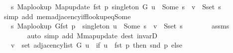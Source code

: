 \begin{isabellebody}
\ {\isachardoublequoteopen}{\isachardot}{\kern0pt}{\isachardot}{\kern0pt}{\isachardot}{\kern0pt}\ {\isasymlongleftrightarrow}\ {\isacharparenleft}{\kern0pt}{\isasymexists}s{\isachardot}{\kern0pt}\ Map{\isacharunderscore}{\kern0pt}lookup\ {\isacharparenleft}{\kern0pt}Map{\isacharunderscore}{\kern0pt}update\ {\isacharparenleft}{\kern0pt}fst\ p{\isacharparenright}{\kern0pt}\ {\isacharquery}{\kern0pt}singleton\ G{\isacharparenright}{\kern0pt}\ u\ {\isacharequal}{\kern0pt}\ Some\ s\ {\isasymand}\ v\ {\isasymin}\ S{\isachardot}{\kern0pt}set\ s{\isacharparenright}{\kern0pt}{\isachardoublequoteclose}\isanewline
\ \ \ \ \ \ \isamarkupfalse%
\ {\isacharparenleft}{\kern0pt}simp\ add{\isacharcolon}{\kern0pt}\ mem{\isacharunderscore}{\kern0pt}adjacency{\isacharunderscore}{\kern0pt}iff{\isacharunderscore}{\kern0pt}lookup{\isacharunderscore}{\kern0pt}eq{\isacharunderscore}{\kern0pt}Some{\isacharparenright}{\kern0pt}\isanewline
\ \ \ \ \isamarkupfalse%
\ \isamarkupfalse%
\ {\isachardoublequoteopen}{\isachardot}{\kern0pt}{\isachardot}{\kern0pt}{\isachardot}{\kern0pt}\ {\isasymlongleftrightarrow}\ {\isacharparenleft}{\kern0pt}{\isasymexists}s{\isachardot}{\kern0pt}\ {\isacharparenleft}{\kern0pt}Map{\isacharunderscore}{\kern0pt}lookup\ G{\isacharparenleft}{\kern0pt}fst\ p\ {\isasymmapsto}\ {\isacharquery}{\kern0pt}singleton{\isacharparenright}{\kern0pt}{\isacharparenright}{\kern0pt}\ u\ {\isacharequal}{\kern0pt}\ Some\ s\ {\isasymand}\ v\ {\isasymin}\ S{\isachardot}{\kern0pt}set\ s{\isacharparenright}{\kern0pt}{\isachardoublequoteclose}\isanewline
\ \ \ \ \ \ \isamarkupfalse%
\ assms\isanewline
\ \ \ \ \ \ \isamarkupfalse%
\ {\isacharparenleft}{\kern0pt}auto\ simp\ add{\isacharcolon}{\kern0pt}\ M{\isachardot}{\kern0pt}map{\isacharunderscore}{\kern0pt}update\ dest{\isacharcolon}{\kern0pt}\ invarD{\isacharparenleft}{\kern0pt}{}{\isacharparenright}{\kern0pt}{\isacharparenright}{\kern0pt}\isanewline
\ \ \ \ \isamarkupfalse%
\ \isamarkupfalse%
\ {\isachardoublequoteopen}{\isachardot}{\kern0pt}{\isachardot}{\kern0pt}{\isachardot}{\kern0pt}\ {\isasymlongleftrightarrow}\ v\ {\isasymin}\ set\ {\isacharparenleft}{\kern0pt}adjacency{\isacharunderscore}{\kern0pt}list\ G\ u{\isacharparenright}{\kern0pt}\ {\isasymunion}\ {\isacharparenleft}{\kern0pt}if\ u\ {\isacharequal}{\kern0pt}\ fst\ p\ then\ {\isacharbraceleft}{\kern0pt}snd\ p{\isacharbraceright}{\kern0pt}\ else\ {\isacharbraceleft}{\kern0pt}{\isacharbraceright}{\kern0pt}{\isacharparenright}{\kern0pt}{\isachardoublequoteclose}\isanewline

\end{isabellebody}
